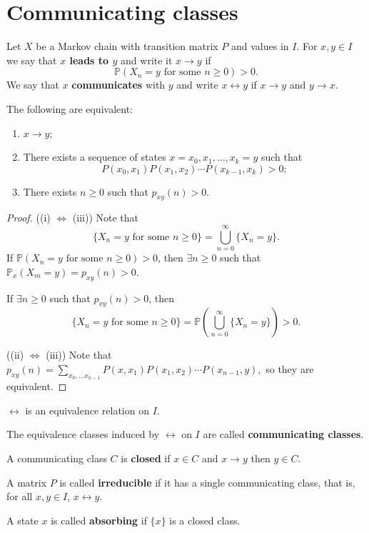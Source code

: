 \documentclass[a4paper,11pt]{article}
\begin{document}
\section{Communicating classes}
\begin{definition}
    Let $X$ be a Markov chain with transition matrix $P$ and values in $I$. For $x, y \in I$ we say that \textbf{$x$ leads to $y$} and write it $x \rightarrow y$ if
    $$
    \mathbb{P}(X_n = y \text{ for some }n \ge 0) > 0. 
    $$
    We say that $x$ \textbf{communicates} with $y$ and write $x \leftrightarrow y$ if $x \rightarrow y$ and $y \rightarrow x$.  
\end{definition}

\begin{theorem}
	The following are equivalent: 
	\begin{enumerate}[label=(\roman*)]
		\item $x \rightarrow y$;
		\item There exists a sequence of states $x = x_0, x_1, \dots, x_k = y$ such that 
		$$P(x_0, x_1)P(x_1, x_2) \cdots P(x_{k - 1}, x_k) > 0;$$
		\item There exists $n \ge 0$ such that $p_{xy}(n) > 0$.
	\end{enumerate}
\end{theorem}
\begin{proof}
    ((i) $ \Leftrightarrow $ (iii)) Note that 
    \[
        \{X_n=y \text{ for some }n\ge 0\} = \bigcup_{n=0}^{\infty}\{X_n=y\}.
    \]
    If $ \mathbb{P}(X_n = y \text{ for some }n \ge 0) > 0 $, then $ \exists n\ge 0 $ such that $ \mathbb{P}_x(X_m=y)=p_{xy}(n)>0 $.

    If $ \exists n\ge 0 $ such that $ p_{xy}(n)>0 $, then 
    \[
        \{X_n=y \text{ for some }n\ge 0\}=\mathbb{P}\left( \bigcup_{n=0}^{\infty}\{X_n=y\} \right)>0.
    \]

    ((ii) $ \Leftrightarrow  $ (iii)) Note that $ p_{xy}(n) = \sum_{x_0,\dots x_{n-1}} P(x,x_1)P(x_1,x_2)\cdots P(x_{n-1},y), $
    so they are equivalent.
\end{proof}
\begin{corollary}
    $ \leftrightarrow $ is an equivalence relation on $I$.
\end{corollary}
\begin{definition}
	The equivalence classes induced by $\leftrightarrow$ on $I$ are called \textbf{communicating classes}.

    A communicating class $C$ is \textbf{closed} if $x \in C$ and $x \rightarrow y$ then $y \in C$.

    A matrix $P$ is called \textbf{irreducible} if it has a single communicating class, that is, for all $x, y \in I$, $x \leftrightarrow y$. 

    A state $x$ is called \textbf{absorbing} if $\{x\}$ is a closed class. 
\end{definition}
\end{document}
